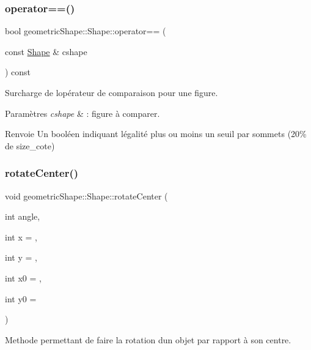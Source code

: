 \subsubsection{\texorpdfstring{operator==()}{operator==()}}
{\footnotesize\ttfamily bool geometric\+Shape\+::\+Shape\+::operator== (\begin{DoxyParamCaption}\item[{const \hyperlink{classgeometric_shape_1_1_shape}{Shape} \&}]{cshape }\end{DoxyParamCaption}) const}



Surcharge de l\textquotesingle{}opérateur de comparaison pour une figure. 


\begin{DoxyParams}{Paramètres}
{\em cshape} & \+: figure à comparer. \\
\hline
\end{DoxyParams}
\begin{DoxyReturn}{Renvoie}
Un booléen indiquant l\textquotesingle{}égalité plus ou moins un seuil par sommets (20\% de size\+\_\+cote) 
\end{DoxyReturn}
\mbox{\label{classgeometric_shape_1_1_shape_a2c958faaa126d4190304be1acf3328b9}} 
\subsubsection{\texorpdfstring{rotate\+Center()}{rotateCenter()}}
{\footnotesize\ttfamily void geometric\+Shape\+::\+Shape\+::rotate\+Center (\begin{DoxyParamCaption}\item[{int}]{angle,  }\item[{int}]{x = {},  }\item[{int}]{y = {},  }\item[{int}]{x0 = {},  }\item[{int}]{y0 = {} }\end{DoxyParamCaption})\hspace{0.3cm}{\ttfamily [protected]}}



Methode permettant de faire la rotation d\textquotesingle{}un objet par rapport à son centre. 


